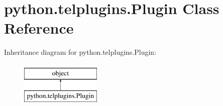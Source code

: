 \hypertarget{classpython_1_1telplugins_1_1_plugin}{\section{python.\-telplugins.\-Plugin Class Reference}
\label{classpython_1_1telplugins_1_1_plugin}
}
Inheritance diagram for python.\-telplugins.\-Plugin\-:\begin{figure}[H]
\begin{center}
\leavevmode
\includegraphics[height=2.000000cm]{classpython_1_1telplugins_1_1_plugin}
\end{center}
\end{figure}
